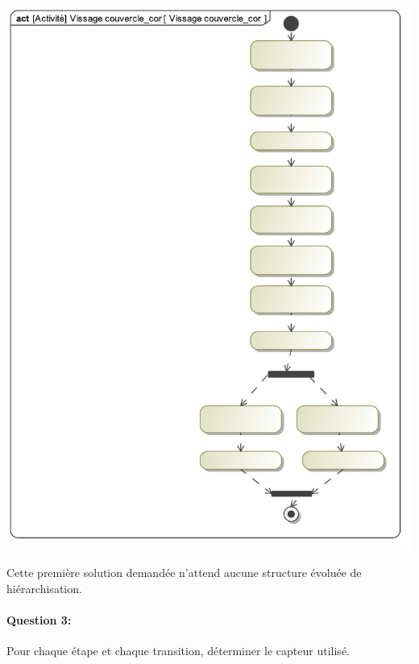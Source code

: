 \begin{center}
 \includegraphics[width=\linewidth]{img/Vissage_couvercle}
\end{center}

Cette première solution demandée n'attend aucune structure évoluée de hiérarchisation. 

\newpage

\paragraph{Question 3:} Pour chaque étape et chaque transition, déterminer le capteur utilisé.

\reponse[10]


